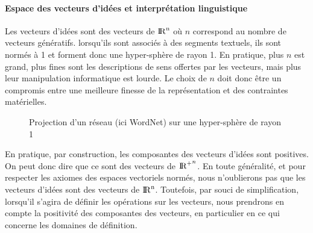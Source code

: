 {\paragraph{Espace des vecteurs d'idées et interprétation linguistique} 

Les vecteurs d'idées sont des vecteurs de
$\rm{I \! R}^n$ où $n$ correspond au nombre de 
vecteurs génératifs. lorsqu'ils sont associés à des segments textuels,
ils sont normés à 1 et forment donc une hyper-sphère de rayon 1. En
pratique, plus $n$ est grand, plus fines sont les descriptions de sens
offertes par les vecteurs, mais plus leur manipulation informatique
est lourde.  Le choix de $n$ doit donc être un compromis entre une
meilleure finesse de la représentation et des contraintes matérielles.

\begin{figure}[h]
\caption{Projection d'un réseau (ici WordNet) sur une hyper-sphère de rayon 1}
\label{emergence-VC}
\end{figure}

En pratique, par construction, les composantes des vecteurs
d'idées sont positives. On peut donc dire que
ce sont des vecteurs de ${\rm{I \! R}^{+}}^n$.  En toute généralité, et pour
respecter les axiomes des  espaces
vectoriels normés, nous n'oublierons pas que les vecteurs
d'idées sont des vecteurs de $\rm{I \! R}^n$.
Toutefois, par souci de simplification, lorsqu'il s'agira de définir
les opérations sur les vecteurs, nous prendrons en compte la
positivité des composantes des vecteurs, en particulier en ce qui
concerne les domaines de définition.

}

